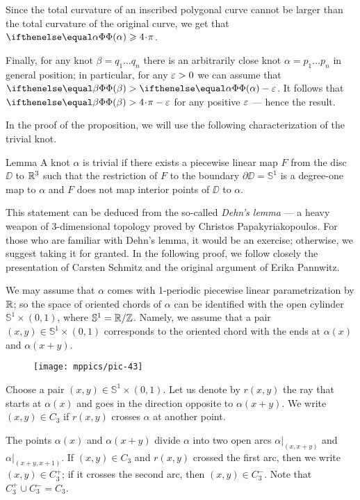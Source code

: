 Since the total curvature of an inscribed polygonal curve cannot be larger than the total curvature of the original curve, we get that $\tc{\alpha}\z\ge 4\cdot\pi$.

Finally, for any knot $\beta=q_1\dots q_n$ there is an arbitrarily close knot $\alpha=p_1\dots p_n$ in general position;
in particular, for any $\varepsilon>0$ we can assume that $\tc{\beta}>\tc\alpha-\eps$.
It follows that $\tc{\beta}>4\cdot\pi-\eps$ for any positive $\varepsilon$ --- hence the result.
\qeds

In the proof of the proposition, we will use the following characterization of the trivial knot.

\begin{thm}{Lemma}
A knot $\alpha$ is trivial if there exists a piecewise linear map $F$ from the disc $\DD$ to $\mathbb{R}^3$ such that the  restriction of $F$ to the boundary $\partial\DD=\mathbb{S}^1$ is a degree-one map to $\alpha$ and $F$ does not map interior points of $\DD$ to $\alpha$.
\end{thm}

This statement can be deduced from the so-called \textit{Dehn's lemma} --- a heavy weapon of 3-dimensional topology proved by Christos Papakyriakopoulos.
For those who are familiar with Dehn's lemma, it would be an exercise; otherwise, we suggest taking it for granted.
In the following proof, we follow closely the presentation of Carsten Schmitz \cite{schmitz} and the original argument of Erika Pannwitz.

We may assume that $\alpha$ comes with 1-periodic piecewise linear parametrization by $\mathbb{R}$;
so the space of oriented chords of $\alpha$ can be identified with the open cylinder $\mathbb{S}^1\times (0,1)$, where $\mathbb{S}^1=\mathbb{R}/\mathbb{Z}$.
Namely, we assume that a pair $(x,y)\in \mathbb{S}^1\times (0,1)$ corresponds to the oriented chord with the ends at $\alpha(x)$ and $\alpha(x+y)$.

\begin{wrapfigure}{r}{42 mm}
\vskip-0mm
\centering
\texttt{[image: mppics/pic-43]}
\vskip0mm
\end{wrapfigure}

Choose a pair $(x,y)\in \mathbb{S}^1\times (0,1)$.
Let us denote by $r(x,y)$ the ray that starts at $\alpha(x)$ and goes in the direction opposite to $\alpha(x+y)$.
We write $(x,y)\in C_3$ if $r(x,y)$ crosses $\alpha$ at another point.

The points $\alpha(x)$ and $\alpha(x+y)$ divide $\alpha$ into two open arcs $\alpha|_{(x,x+y)}$ and $\alpha|_{(x+y,x+1)}$.
If $(x,y)\in C_3$ and $r(x,y)$ crossed the first arc, then we write $(x,y)\in C_3^+$;
if it crosses the second arc, then $(x,y)\in C_3^-$.
Note that $C_3^+\cup C_3^-=C_3$.

